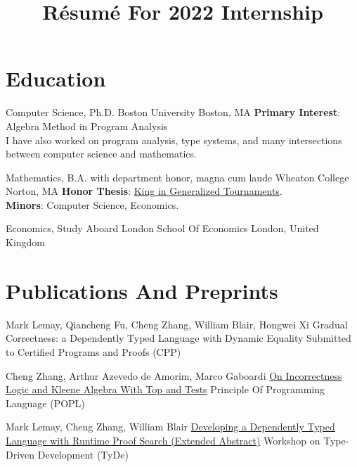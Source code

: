 \documentclass[11pt,roman]{moderncv}        %
\title{Résumé For 2022 Internship}
\begin{document}

\makecvtitle{}

\setlength{\parskip}{2.5px}
\linespread{1.3}
\selectfont


\section{Education}

{Computer Science, Ph.D.} {}
{Boston University}
{Boston, MA}
{\textbf{Primary Interest}: Algebra Method in Program Analysis\\
I have also worked on program analysis, type systems,
and many intersections between computer science and mathematics.}  %

{Mathematics, B.A.} {with department honor, magna cum laude}
{Wheaton College}
{Norton, MA}
{\textbf{Honor Thesis}: \href{http://hdl.handle.net/11040/24570}{King in Generalized Tournaments}.\\
\textbf{Minors}: Computer Science, Economics.
}

{Economics, Study Aboard} {}
{London School Of Economics}
{London, United Kingdom}
{}  %



\section{Publications And Preprints}


{Mark Lemay, Qiancheng Fu, Cheng Zhang, William Blair, Hongwei Xi}
{Gradual Correctness: a Dependently Typed Language with Dynamic Equality}
{Submitted to Certified Programs and Proofs (CPP)}{}{}

{Cheng Zhang, Arthur Azevedo de Amorim, Marco Gaboardi}
{\href{https://arxiv.org/abs/2108.07707}{On Incorrectness Logic and Kleene Algebra With Top and Tests}}
{Principle Of Programming Language (POPL)}
{}{}

{Mark Lemay, Cheng Zhang, William Blair}
{\href{https://icfp20.sigplan.org/details/tyde-2020-papers/7/Developing-a-Dependently-Typed-Language-with-Runtime-Proof-Search-Extended-Abstract-}
{Developing a Dependently Typed Language with Runtime Proof Search (Extended Abstract)}}
{Workshop on Type-Driven Development (TyDe)}
{}{}
\end{document}
